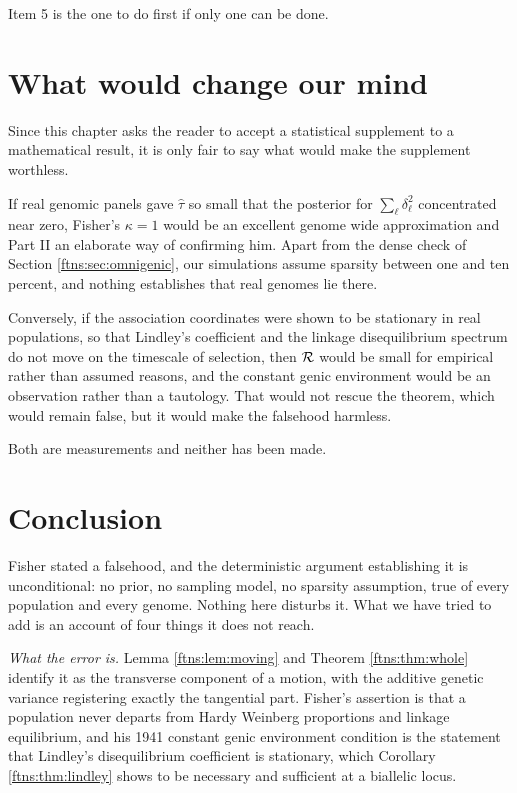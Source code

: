 Item 5 is the one to do first if only one can be done.

\section{What would change our mind}
\label{ftns:sec:mind}

Since this chapter asks the reader to accept a statistical supplement to a mathematical result, it is
only fair to say what would make the supplement worthless.

If real genomic panels gave $\hat\tau$ so small that the posterior for $\sum_\ell\delta_\ell^2$
concentrated near zero, Fisher's $\kappa=1$ would be an excellent genome wide approximation and
Part II an elaborate way of confirming him. Apart from the dense check of Section \ref{ftns:sec:omnigenic}, our simulations assume sparsity between one and ten
percent, and nothing establishes that real genomes lie there.

Conversely, if the association coordinates were shown to be stationary in real populations, so that
Lindley's coefficient and the linkage disequilibrium spectrum do not move on the timescale of
selection, then $\mathcal{R}$ would be small for empirical rather than assumed reasons, and the constant
genic environment would be an observation rather than a tautology. That would not rescue the
theorem, which would remain false, but it would make the falsehood harmless.

Both are measurements and neither has been made.

\section{Conclusion}

Fisher stated a falsehood, and the deterministic argument establishing it is unconditional: no
prior, no sampling model, no sparsity assumption, true of every population and every genome.
Nothing here disturbs it. What we have tried to add is an account of four things it does not reach.

\emph{What the error is.} Lemma \ref{ftns:lem:moving} and Theorem \ref{ftns:thm:whole} identify it as the
transverse component of a motion, with the additive genetic variance registering exactly the
tangential part. Fisher's assertion is that a population never departs from Hardy Weinberg
proportions and linkage equilibrium, and his 1941 constant genic environment condition is the
statement that Lindley's disequilibrium coefficient is stationary, which
Corollary \ref{ftns:thm:lindley} shows to be necessary and sufficient at a biallelic locus.

